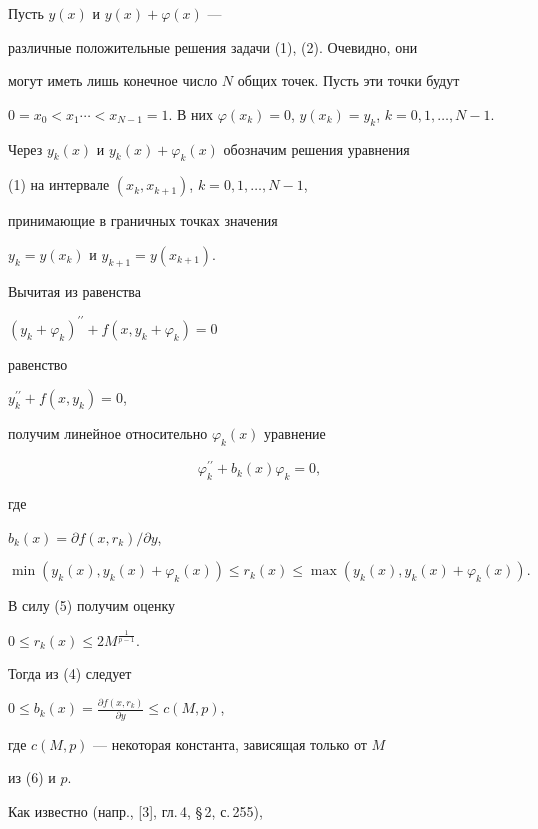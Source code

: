 \begin{pf} 


Пусть $y(x)$ и $y(x)+\varphi(x)$ ---


различные положительные решения задачи (1), (2). Очевидно, они


могут иметь лишь конечное число $N$ общих точек. Пусть эти точки будут 


$0=x_0<x_1 \dotsb <


x_{N-1}=1$. В них $\varphi(x_k)=0$, $y(x_k)=y_k$, $k=0,1,\dotsc, N-1$.


Через $y_k(x)$ и $y_k(x)+\varphi_k(x)$ обозначим решения уравнения


(1) на интервале $(x_k,x_{k+1})$, $k=0,1,\dotsc, N-1$,


принимающие в граничных точках значения


$y_k=y(x_k)$ и $y_{k+1}=y(x_{k+1})$.


Вычитая из равенства


$(y_k+\varphi_k)^{\prime\prime}+f(x,y_k+\varphi_k)=0$


равенство


$y^{\prime\prime}_k+f(x,y_k)=0$,


получим линейное относительно $\varphi_k(x)$ уравнение 


\begin{equation}


\varphi^{\prime\prime}_k+b_k(x)\varphi_k=0,


\end{equation}


где


$b_k(x)={\partial f(x,r_k)}/{\partial y }$,


$$


\min(y_k(x), y_k(x)+\varphi_k(x)) \leq r_k(x) 


\leq \max(y_k(x), y_k(x)+\varphi_k(x)).


$$


В силу (5) получим оценку


$0\leq r_k(x)\leq 2M^{\frac{1}{p-1}}$.


Тогда из (4) следует


$0 \leq b_k(x)=\frac{\partial f(x,r_k)}


{\partial y} \leq c(M,p)$,


где $c(M,p)$ --- некоторая константа, зависящая только от $M$


из (6) и $p$.





Как известно (напр., [3], гл.\,4, \S\,2, с.\,255),



\end{pf}
